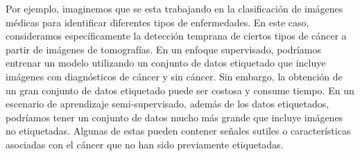Por ejemplo, imaginemos que se esta trabajando en la clasificación de imágenes médicas para identificar diferentes tipos de enfermedades. En este caso, consideramos específicamente la detección temprana de ciertos tipos de cáncer a partir de imágenes de tomografías. En un enfoque supervisado, podríamos entrenar un modelo utilizando un conjunto de datos etiquetado que incluye imágenes con diagnósticos de cáncer y sin cáncer. Sin embargo, la obtención de un gran conjunto de datos etiquetado puede ser costosa y consume tiempo. En un escenario de aprendizaje semi-supervisado, además de los datos etiquetados, podríamos tener un conjunto de datos mucho más grande que incluye imágenes no etiquetadas. Algunas de estas pueden contener señales sutiles o características asociadas con el cáncer que no han sido previamente etiquetadas.

